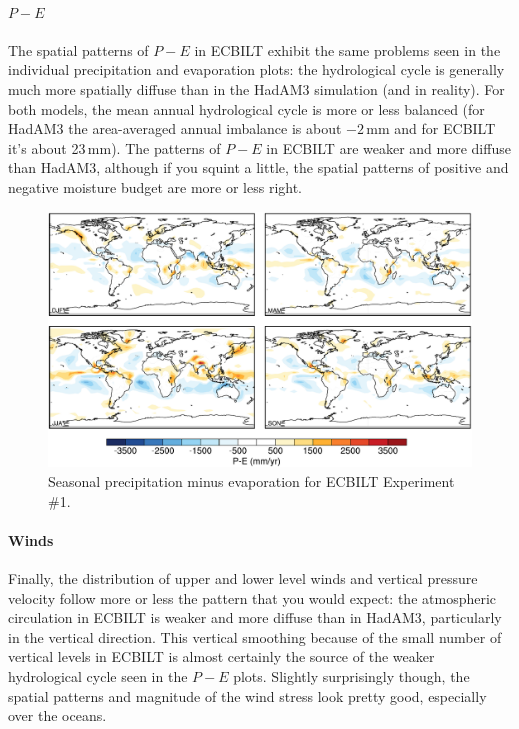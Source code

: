 \documentclass[a4paper,11pt]{article}
\begin{document}
\paragraph{$P-E$}

The spatial patterns of $P-E$ in ECBILT exhibit the same problems seen
in the individual precipitation and evaporation plots: the
hydrological cycle is generally much more spatially diffuse than in
the HadAM3 simulation (and in reality).  For both models, the mean
annual hydrological cycle is more or less balanced (for HadAM3 the
area-averaged annual imbalance is about $-2$\,mm and for ECBILT it's
about 23\,mm).  The patterns of $P-E$ in ECBILT are weaker and more
diffuse than HadAM3, although if you squint a little, the spatial
patterns of positive and negative moisture budget are more or less
right.

\begin{figure}
  \begin{center}
    \includegraphics[width=\textwidth]{../expt-1/plots/pmine-plots}
  \end{center}
  \caption{Seasonal precipitation minus evaporation for ECBILT
    Experiment \#1.}
  \label{fig:pmine-1}
\end{figure}

\paragraph{Winds}

Finally, the distribution of upper and lower level winds and vertical
pressure velocity follow more or less the pattern that you would
expect: the atmospheric circulation in ECBILT is weaker and more
diffuse than in HadAM3, particularly in the vertical direction.  This
vertical smoothing because of the small number of vertical levels in
ECBILT is almost certainly the source of the weaker hydrological cycle
seen in the $P-E$ plots.  Slightly surprisingly though, the spatial
patterns and magnitude of the wind stress look pretty good, especially
over the oceans.
\end{document}
